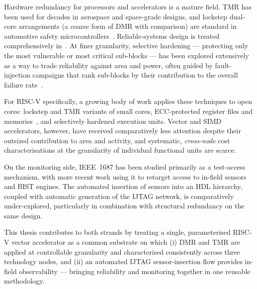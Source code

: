Hardware redundancy for processors and accelerators is a mature field. TMR has
been used for decades in aerospace and space-grade designs, and lockstep
dual-core arrangements (a coarse form of DMR with comparison) are standard in
automotive safety microcontrollers~\cite{lockstep}. Reliable-systems design is treated comprehensively in~\cite{siewiorek,koren}. At finer granularity, selective hardening
--- protecting only the most vulnerable or most critical sub-blocks --- has been
explored extensively as a way to trade reliability against area and power, often
guided by fault-injection campaigns that rank sub-blocks by their contribution
to the overall failure rate~\cite{mukherjee,riscv-hardening}.

For RISC-V specifically, a growing body of work applies these techniques to open
cores: lockstep and TMR variants of small cores, ECC-protected register files
and memories~\cite{tmr-fpga}, and selectively hardened execution units. Vector and SIMD
accelerators, however, have received comparatively less attention despite their
outsized contribution to area and activity, and systematic, \emph{cross-node}
cost characterisations at the granularity of individual functional units are
scarce.

On the monitoring side, IEEE~1687 has been studied primarily as a test-access
mechanism, with more recent work using it to retarget access to in-field sensors
and BIST engines. The automated insertion of sensors into an HDL hierarchy,
coupled with automatic generation of the IJTAG network, is comparatively
under-explored, particularly in combination with structural redundancy on the
same design.

This thesis contributes to both strands by treating a single, parameterised
RISC-V vector accelerator as a common substrate on which (i) DMR and TMR are
applied at controllable granularity and characterised consistently across three
technology nodes, and (ii) an automated IJTAG sensor-insertion flow provides
in-field observability --- bringing reliability and monitoring together in one
reusable methodology.
